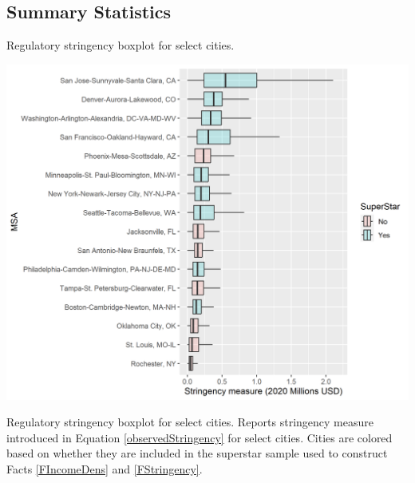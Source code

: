 \documentclass[12pt]{article}
\begin{document}
	
	\clearpage
	
	\subsection{Summary Statistics}\label{Appendix:FactsSummaryStats}
	\begin{table}[htbp!]	
		\caption{Regulatory stringency boxplot for select cities.}\label{table:BoxplotStringency}
		\includegraphics[width=\textwidth]{Facts_incomeStringency_boxplot.png}
		\caption*{Regulatory stringency boxplot for select cities. Reports stringency measure introduced in Equation \eqref{observedStringency} for select cities. Cities are colored based on whether they are included in the superstar sample used to construct Facts \ref{FIncomeDens} and \ref{FStringency}. }
	\end{table}
	
	\clearpage
	
\end{document}
